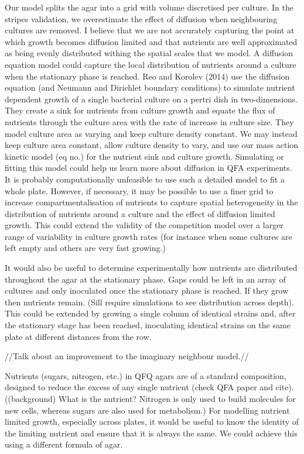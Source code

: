 Our model splits the agar into a grid with volume discretised per
culture. In the stripes validation, we overestimate the effect of
diffusion when neighbouring cultures are removed. I believe that we
are not accurately capturing the point at which growth becomes
diffusion limited and that nutrients are well approximated as being
evenly distributed withing the spatial scales that we model. A
diffusion equation model could capture the local distribution of
nutrients around a culture when the stationary phase is reached.  Reo
and Korolev (2014) use the diffusion equation (and Neumann and
Dirichlet boundary conditions) to simulate nutrient dependent growth
of a single bacterial culture on a pertri dish in two-dimensions. They
create a sink for nutrients from culture growth and equate the flux of
nutrients through the culture area with the rate of increase in
culture size. They model culture area as varying and keep culture
density constant. We may instead keep culture area constant, allow
culture density to vary, and use our mass action kinetic model (eq
no.) for the nutrient sink and culture growth. Simulating or fitting
this model could help us learn more about diffusion in QFA
experiments.  It is probably computationally unfeasible to use such a
detailed model to fit a whole plate. However, if necessary, it may be
possible to use a finer grid to increase compartmentalisation of
nutrients to capture spatial heterogeneity in the distribution of
nutrients around a culture and the effect of diffusion limited
growth. This could extend the validity of the competition model over a
larger range of variability in culture growth rates (for instance when
some cultures are left empty and others are very fast growing.)

It would also be useful to determine experimentally how nutrients are
distributed throughout the agar at the stationary phase. Gaps could be
left in an array of cultures and only inoculated once the stationary
phase is reached. If they grow then nutrients remain. (Sill require
simulations to see distribution across depth). This could be extended
by growing a single column of identical strains and, after the
stationary stage has been reached, inoculating identical strains on
the same plate at different distances from the row.

//Talk about an improvement to the imaginary neighbour model.//

Nutrients (sugars, nitrogen, etc.) in QFQ agars are of a standard
composition, designed to reduce the excess of any single nutrient
(check QFA paper and cite). ((background) What is the nutrient?
Nitrogen is only used to build molecules for new cells, whereas sugars
are also used for metabolism.) For modelling nutrient limited growth,
especially across plates, it would be useful to know the identity of
the limiting nutrient and ensure that it is always the same. We could
achieve this using a different formula of agar.

